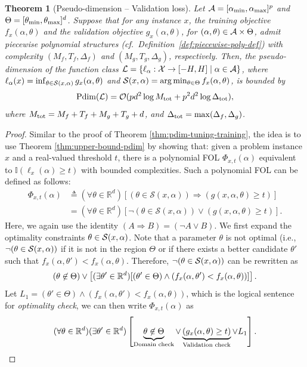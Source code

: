 \documentclass{article}
\theoremstyle{plain}
\newtheorem{theorem}{Theorem}[section]
\theoremstyle{definition}
\theoremstyle{remark}
\begin{document}
\begin{theorem}[Pseudo-dimension -- Validation loss] \label{thm:pdim-tuning-validation}
    Let $\mathcal{A} = [\alpha_\textup{min}, \alpha_\textup{max}]^p$ and $\Theta = [\theta_\textup{min}, \theta_\textup{max}]^d$. Suppose that for any instance $x$, the training objective $f_x(\alpha, \theta)$ and the validation objective $g_x(\alpha, \theta)$, for $(\alpha, \theta) \in \mathcal{A} \times \Theta$, admit piecewise polynomial structures (cf.~Definition~\ref{def:piecewise-poly-def}) with complexity $(M_f, T_f, \Delta_f)$ and $(M_g, T_g, \Delta_g)$, respectively. Then, the pseudo-dimension of the function class $\mathcal{L}=  \{\ell_\alpha: \mathcal{X} \rightarrow [-H, H] \mid \alpha \in \mathcal{A}\}$, where $\ell_\alpha(x) = \inf_{\theta \in \mathcal{S}(x, \alpha)}g_x(\alpha, \theta)$ and $\mathcal{S}(x, \alpha) = \arg \min_{\theta \in \Theta}f_x(\alpha, \theta)$, is bounded by
    \[
        \text{\normalfont Pdim}(\mathcal{L}) = \mathcal{O}(pd^2\log M_\textup{tot} + p^2d^2 \log \Delta_\textup{tot}),
    \]
    where $M_\textup{tot} = M_f + T_f + M_g + T_g + d$, and $\Delta_\textup{tot} = \max(\Delta_f, \Delta_g)$.
\end{theorem}
\begin{proof}
    Similar to the proof of Theorem \ref{thm:pdim-tuning-training}, the idea is to use Theorem \ref{thm:upper-bound-pdim} by showing that: given a problem instance $x$ and a real-valued threshold $t$, there is a polynomial FOL $\Phi_{x, t}(\alpha)$ equivalent to $\mathbb{I}(\ell_x(\alpha) \geq t)$ with bounded complexities. Such a polynomial FOL can be defined as follows:
    \begin{equation*}
        \begin{aligned}
            \Phi_{x,t}(\alpha) &\triangleq (\forall \theta \in \mathbb{R}^d) \left[ (\theta \in \mathcal{S}(x, \alpha)) \Rightarrow (g(x, \alpha, \theta) \ge t)\right] \\
            &= (\forall \theta \in \mathbb{R}^d) \left[ \neg (\theta \in \mathcal{S}(x, \alpha)) \lor (g(x, \alpha, \theta) \ge t)\right].
        \end{aligned}
    \end{equation*}
    Here, we again use the identity $(A \Rightarrow B) = (\neg A \lor B)$. We first expand the optimality constraints $\theta \in \mathcal{S}(x, \alpha)$. Note that a parameter $\theta$ is not optimal (i.e., $\neg (\theta \in \mathcal{S}(x, \alpha))$ if it is not in the region $\Theta$ or if there exists a better candidate $\theta'$ such that $f_x(\alpha, \theta') < f_x(\alpha, \theta)$. Therefore, $\neg (\theta \in \mathcal{S}(x, \alpha))$ can be rewritten as
    \[
        (\theta \not \in \Theta) \lor \left[(\exists \theta' \in \mathbb{R}^d)[(\theta' \in \Theta) \land (f_x(\alpha, \theta') < f_x(\alpha, \theta))]\right].
    \]
    Let $L_1 = (\theta' \in \Theta) \land (f_x(\alpha, \theta') < f_x(\alpha, \theta))$, which is the logical sentence for \textit{optimality check}, we can then write $\Phi_{x, t}(\alpha)$ as 
    \[
        (\forall \theta \in \mathbb{R}^d)(\exists \theta' \in \mathbb{R}^d)\left[\underbrace{\theta \not \in \Theta}_{\textup{Domain check}} \lor \underbrace{(g_x(\alpha, \theta) \geq t)}_{\textup{Validation check}} \lor L_1\right].
    \]
\end{proof}
\end{document}
